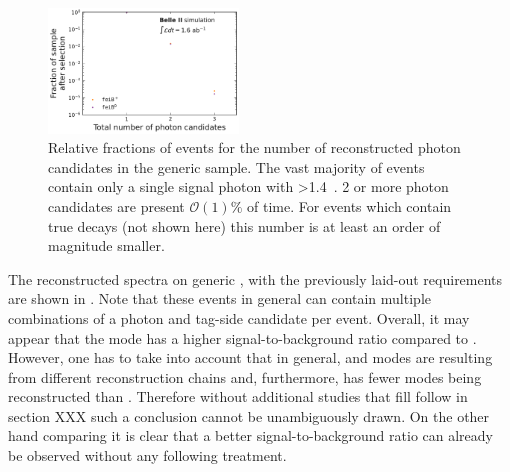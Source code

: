 \begin{figure}[htbp!]
    \centering
    \includegraphics[width=0.45\textwidth]{figures/event_reconstruction/Bboth_total_photon_candidates.pdf}
    \caption{\label{fig:photon_reco_candidates} Relative fractions of events for the number of reconstructed photon candidates in the generic \MC sample.
    The vast majority of events contain only a single signal photon with \EB>1.4~\gev.
    2 or more photon candidates are present $\mathcal{O}(1)\%$ of time.
    For events which contain true \BtoXsgamma decays (not shown here) this number is at least an order of magnitude smaller.
    }
\end{figure}

The reconstructed \BtoXsgamma spectra on generic \MC, with the previously laid-out requirements are shown in .
Note that these events in general can contain multiple combinations of a photon and tag-side candidate per event.
Overall, it may appear that the \FEI \Bz mode has a higher signal-to-background ratio compared to \FEI \Bp.
However, one has to take into account that in general, \FEI \Bp and \FEI \Bz modes are resulting from different reconstruction chains and, furthermore, \FEI \Bz has fewer modes being reconstructed than \FEI \Bp.
Therefore without additional studies that fill follow in section XXX such a conclusion cannot be unambiguously drawn. 
On the other hand comparing  it is clear that a better signal-to-background ratio can already be observed without any following treatment.

